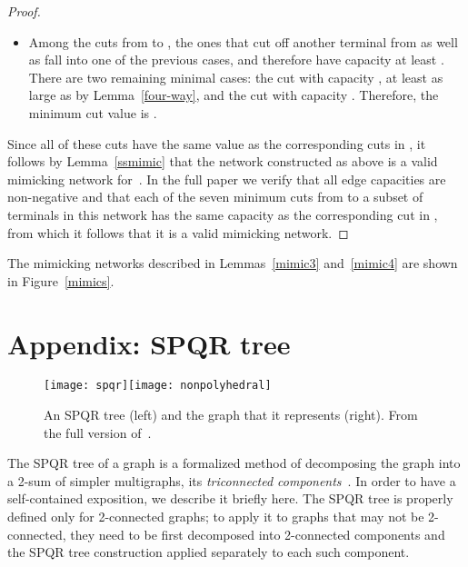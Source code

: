 \documentclass[runningheads]{llncs}
\begin{document}
\begin{proof}
\begin{itemize}
\item Among the cuts from  to , the ones that cut off another terminal from  as well as  fall into one of the previous cases, and therefore have capacity at least . There are two remaining minimal cases: the cut  with capacity , at least as large as  by Lemma~\ref{four-way}, and the cut  with capacity . Therefore, the minimum cut value is .
\end{itemize}
Since all of these cuts have the same value as the corresponding cuts in , it follows by Lemma~\ref{ssmimic} that the network constructed as above is a valid mimicking network for~.
In the full paper we verify that all edge capacities are non-negative and that each of the seven minimum cuts from  to a subset of terminals in this network has the same capacity as the corresponding cut in , from which it follows that it is a valid mimicking network.
\end{proof}

The mimicking networks described in Lemmas~\ref{mimic3} and~\ref{mimic4} are shown in Figure~\ref{mimics}.

\newpage
\section*{Appendix: SPQR tree}

\begin{figure}[t]
\centering\texttt{[image: spqr]}\qquad\texttt{[image: nonpolyhedral]}
\caption{An SPQR tree (left) and the graph that it represents (right). From the full version of~\cite{em-stop-10}.}
\label{fig:spqr}
\end{figure}

The SPQR tree of a graph is a formalized method of decomposing the graph into a 2-sum of simpler multigraphs, its \emph{triconnected components}~\cite{dt-ipt-89,ht-dgtc-73,m-scpcg-37}. In order to have a self-contained exposition, we describe it briefly here. The SPQR tree is properly defined only for 2-connected graphs; to apply it to graphs that may not be 2-connected, they need to be first decomposed into 2-connected components and the SPQR tree construction applied separately to each such component.
\end{document}
